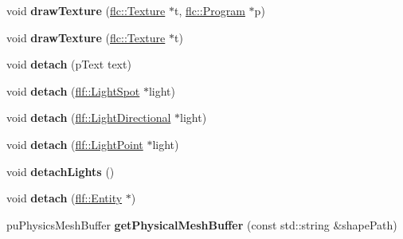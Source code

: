 \begin{DoxyCompactItemize}
\item 
void {\bfseries draw\+Texture} (\hyperlink{classflw_1_1flc_1_1Texture}{flc\+::\+Texture} $\ast$t, \hyperlink{classflw_1_1flc_1_1Program}{flc\+::\+Program} $\ast$p)\hypertarget{classflw_1_1Engine_a0f9be72217d6d7b75e3733ca5d84b017}{}\label{classflw_1_1Engine_a0f9be72217d6d7b75e3733ca5d84b017}

\item 
void {\bfseries draw\+Texture} (\hyperlink{classflw_1_1flc_1_1Texture}{flc\+::\+Texture} $\ast$t)\hypertarget{classflw_1_1Engine_a4d587f6fb90fc7a768de763dce482f09}{}\label{classflw_1_1Engine_a4d587f6fb90fc7a768de763dce482f09}

\item 
void {\bfseries detach} (p\+Text text)\hypertarget{classflw_1_1Engine_a5332338c3dbbeddd07a17a2e54ec4c56}{}\label{classflw_1_1Engine_a5332338c3dbbeddd07a17a2e54ec4c56}

\item 
void {\bfseries detach} (\hyperlink{classflw_1_1flf_1_1LightSpot}{flf\+::\+Light\+Spot} $\ast$light)\hypertarget{classflw_1_1Engine_ae9875ee870b6a6ced53f326b6f5d5624}{}\label{classflw_1_1Engine_ae9875ee870b6a6ced53f326b6f5d5624}

\item 
void {\bfseries detach} (\hyperlink{classflw_1_1flf_1_1LightDirectional}{flf\+::\+Light\+Directional} $\ast$light)\hypertarget{classflw_1_1Engine_ad60883038374172d30c55545df440da2}{}\label{classflw_1_1Engine_ad60883038374172d30c55545df440da2}

\item 
void {\bfseries detach} (\hyperlink{classflw_1_1flf_1_1LightPoint}{flf\+::\+Light\+Point} $\ast$light)\hypertarget{classflw_1_1Engine_ad315c597cc2919ec2b1c0528b3d4b8d9}{}\label{classflw_1_1Engine_ad315c597cc2919ec2b1c0528b3d4b8d9}

\item 
void {\bfseries detach\+Lights} ()\hypertarget{classflw_1_1Engine_a22021b98e5911ba083cd85d09b9e2edb}{}\label{classflw_1_1Engine_a22021b98e5911ba083cd85d09b9e2edb}

\item 
void {\bfseries detach} (\hyperlink{classflw_1_1flf_1_1Entity}{flf\+::\+Entity} $\ast$)\hypertarget{classflw_1_1Engine_a28a44080d29beb1bb029661878f29287}{}\label{classflw_1_1Engine_a28a44080d29beb1bb029661878f29287}

\item 
pu\+Physics\+Mesh\+Buffer {\bfseries get\+Physical\+Mesh\+Buffer} (const std\+::string \&shape\+Path)\hypertarget{classflw_1_1Engine_aa0886491c6b278c99c51e389415aa46f}{}\label{classflw_1_1Engine_aa0886491c6b278c99c51e389415aa46f}


\end{DoxyCompactItemize}
